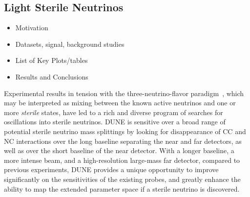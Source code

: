 \subsection{Light Sterile Neutrinos}
\begin{itemize}
\item Motivation
\item Datasets, signal, background studies
\item List of Key Plots/tables
\item Results and Conclusions
\end{itemize}
Experimental results in tension with the three-neutrino-flavor paradigm~\cite{LSNDSterile,MiniBooNESterile,GalliumSummary,ReactorSummary}, which may be interpreted as mixing between the known active neutrinos and one or more {\it sterile} states, have led to a rich and diverse program of searches for oscillations into sterile neutrinos.
DUNE is sensitive over a broad range of potential sterile neutrino mass splittings by looking for disappearance of CC and NC interactions over the long baseline separating the near and far detectors, as well as over the short baseline of the near detector. 
With a longer baseline, a more intense beam, and a high-resolution large-mass far detector, compared to previous experiments, DUNE provides a unique opportunity to improve significantly on the sensitivities of the existing probes, and greatly enhance the ability to map the extended parameter space if a sterile neutrino is discovered.

